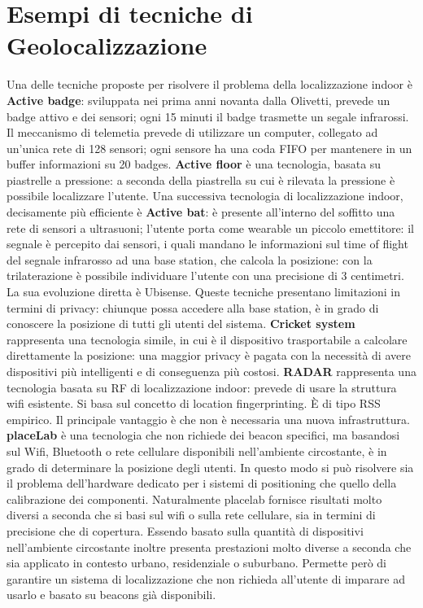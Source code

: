 \section{Esempi di tecniche di Geolocalizzazione}
Una delle tecniche proposte per risolvere il problema della localizzazione
indoor è \textbf{Active badge}: sviluppata nei prima anni novanta dalla
Olivetti, prevede un badge attivo e dei sensori; ogni 15 minuti il badge
trasmette un segale infrarossi. Il meccanismo di telemetia prevede di utilizzare
un computer, collegato ad un'unica rete di 128 sensori; ogni sensore ha una coda
FIFO per mantenere in un buffer informazioni su 20 badges.
\bigbreak
\textbf{Active floor} è una tecnologia, basata su piastrelle a pressione: a
seconda della piastrella su cui è rilevata la pressione è possibile localizzare
l'utente.
\bigbreak
Una successiva tecnologia di localizzazione indoor, decisamente più efficiente è
\textbf{Active bat}: è presente all'interno del soffitto una rete di sensori a
ultrasuoni; l'utente porta come wearable un piccolo emettitore: il segnale è
percepito dai sensori, i quali mandano le informazioni sul time of flight del
segnale infrarosso ad una base station, che calcola la posizione: con la
trilaterazione è possibile individuare l'utente con una precisione di 3
centimetri.
La sua evoluzione diretta è Ubisense.
\bigbreak
Queste tecniche presentano limitazioni in termini di privacy: chiunque possa
accedere alla base station, è in grado di conoscere la posizione di tutti gli
utenti del sistema. \textbf{Cricket system} rappresenta una tecnologia simile,
in cui è il dispositivo trasportabile a calcolare direttamente la posizione: una
maggior privacy è pagata con la necessità di avere dispositivi più intelligenti
e di conseguenza più costosi.
\bigbreak
\textbf{RADAR} rappresenta una tecnologia basata su RF di localizzazione indoor:
prevede di usare la struttura wifi esistente. Si basa sul concetto di location
fingerprinting. È di tipo RSS empirico. Il principale vantaggio è che non è
necessaria una nuova infrastruttura.
\bigbreak
\textbf{placeLab} è una tecnologia che non richiede dei beacon specifici, ma
basandosi sul Wifi, Bluetooth o rete cellulare disponibili nell'ambiente
circostante, è in grado di determinare la posizione degli utenti. In questo modo
si può risolvere sia il problema dell'hardware dedicato per i sistemi di
positioning che quello della calibrazione dei componenti.
Naturalmente placelab fornisce risultati molto diversi a seconda che si basi sul
wifi o sulla rete cellulare, sia in termini di precisione che di copertura.
Essendo basato sulla quantità di dispositivi nell'ambiente circostante inoltre
presenta prestazioni molto diverse a seconda che sia applicato in contesto
urbano, residenziale o suburbano.
Permette però di garantire un sistema di localizzazione che non richieda
all'utente di imparare ad usarlo e basato su beacons già disponibili.

